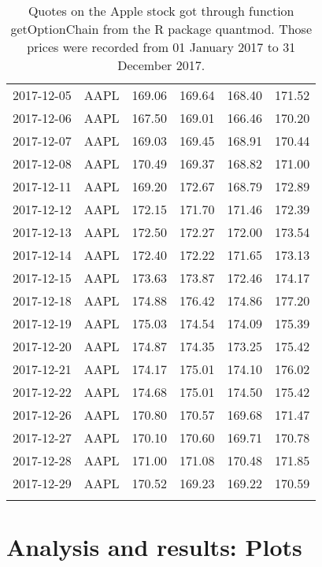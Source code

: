 \documentclass[a4paper, 12pt]{report}
\begin{document}
\begin{appendices}
\begin{longtable}{llllll}
  2017-12-05 & AAPL & 169.06 & 169.64 & 168.40 & 171.52 \\ 
  2017-12-06 & AAPL & 167.50 & 169.01 & 166.46 & 170.20 \\ 
  2017-12-07 & AAPL & 169.03 & 169.45 & 168.91 & 170.44 \\ 
  2017-12-08 & AAPL & 170.49 & 169.37 & 168.82 & 171.00 \\ 
  2017-12-11 & AAPL & 169.20 & 172.67 & 168.79 & 172.89 \\ 
  2017-12-12 & AAPL & 172.15 & 171.70 & 171.46 & 172.39 \\ 
  2017-12-13 & AAPL & 172.50 & 172.27 & 172.00 & 173.54 \\ 
  2017-12-14 & AAPL & 172.40 & 172.22 & 171.65 & 173.13 \\ 
  2017-12-15 & AAPL & 173.63 & 173.87 & 172.46 & 174.17 \\ 
  2017-12-18 & AAPL & 174.88 & 176.42 & 174.86 & 177.20 \\ 
  2017-12-19 & AAPL & 175.03 & 174.54 & 174.09 & 175.39 \\ 
  2017-12-20 & AAPL & 174.87 & 174.35 & 173.25 & 175.42 \\ 
  2017-12-21 & AAPL & 174.17 & 175.01 & 174.10 & 176.02 \\ 
  2017-12-22 & AAPL & 174.68 & 175.01 & 174.50 & 175.42 \\ 
  2017-12-26 & AAPL & 170.80 & 170.57 & 169.68 & 171.47 \\ 
  2017-12-27 & AAPL & 170.10 & 170.60 & 169.71 & 170.78 \\ 
  2017-12-28 & AAPL & 171.00 & 171.08 & 170.48 & 171.85 \\ 
  2017-12-29 & AAPL & 170.52 & 169.23 & 169.22 & 170.59 \\ 
   \hline
\caption[Market stock data (AAPL)]{Quotes on the Apple stock got through function getOptionChain from the R package quantmod. Those prices were recorded from 01 January 2017 to 31 December 2017.}
\label{t:market:stock}
\end{longtable}
\chapter{Analysis and results: Plots}
\label{cha:appendanalysis:plot}




\end{appendices}
\end{document}
